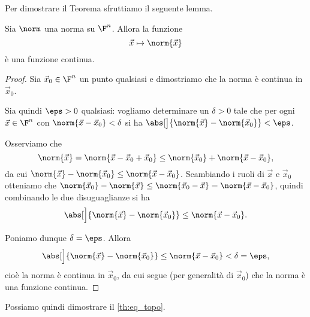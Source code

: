 \eqTopo*

Per dimostrare il Teorema sfruttiamo il seguente lemma.
\begin{lemma}
    Sia $\norm$ una norma su $\F^n$. Allora la funzione \[
        \vec x \mapsto \norm{\vec x}
    \] è una funzione continua.
\end{lemma}
\begin{proof}
    Sia $\vec x_0 \in \F^n$ un punto qualsiasi e dimostriamo che la norma è continua in $\vec x_0$.

    Sia quindi $\eps > 0$ qualsiasi: vogliamo determinare un $\delta > 0$ tale che per ogni $\vec x \in \F^n$ con $\norm{\vec x - \vec x_0} < \delta$ si ha $\abs[\big]{\norm{\vec x} - \norm{\vec x_0}} < \eps$.

    Osserviamo che \[
        \norm{\vec x} = \norm{\vec x - \vec x_0 + \vec x_0} \leq \norm{\vec x_0} + \norm{\vec x - \vec x_0},
    \] da cui $\norm{\vec x} - \norm{\vec x_0} \leq \norm{\vec x - \vec x_0}$. Scambiando i ruoli di $\vec x$ e $\vec x_0$ otteniamo che $\norm{\vec x_0} - \norm{\vec x} \leq \norm{\vec x_0 - \vec x} = \norm{\vec x - \vec x_0}$, quindi combinando le due disuguaglianze si ha \[
        \abs[\Big]{\norm{\vec x} - \norm{\vec x_0}} \leq \norm{\vec x - \vec x_0}.
    \]
    
    Poniamo dunque $\delta = \eps$. Allora \[
        \abs[\Big]{\norm{\vec x} - \norm{\vec x_0}} \leq \norm{\vec x - \vec x_0} < \delta = \eps,
    \] cioè la norma è continua in $\vec x_0$, da cui segue (per generalità di $\vec x_0$) che la norma è una funzione continua.
\end{proof}

Possiamo quindi dimostrare il \autoref{th:eq_topo}.
